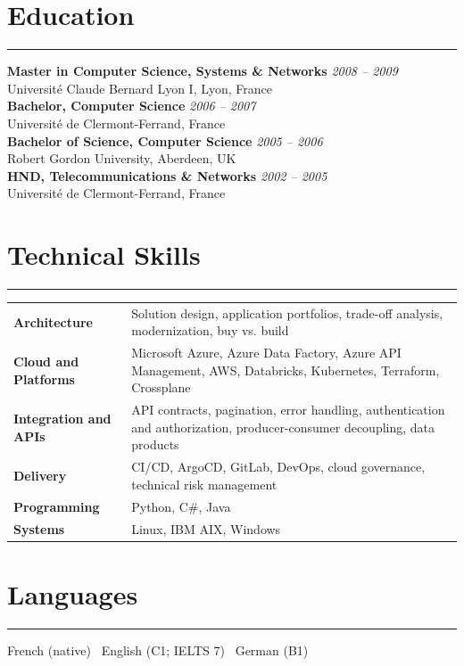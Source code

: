 \documentclass[10pt,a4paper]{article}
\newcommand{\sectionrule}{\noindent\rule{\linewidth}{0.4pt}\par\vspace{0.24em}}
\begin{document}
\section*{Education}
\sectionrule
\textbf{Master in Computer Science, Systems \& Networks} \hfill \textit{2008 -- 2009}\\
Université Claude Bernard Lyon I, Lyon, France\\
\textbf{Bachelor, Computer Science} \hfill \textit{2006 -- 2007}\\
Université de Clermont-Ferrand, France\\
\textbf{Bachelor of Science, Computer Science} \hfill \textit{2005 -- 2006}\\
Robert Gordon University, Aberdeen, UK\\
\textbf{HND, Telecommunications \& Networks} \hfill \textit{2002 -- 2005}\\
Université de Clermont-Ferrand, France

\section*{Technical Skills}
\sectionrule
\begin{tabularx}{\textwidth}{@{}>{\bfseries}l X@{}}
Architecture & Solution design, application portfolios, trade-off analysis, modernization, buy vs. build \\
Cloud and Platforms & Microsoft Azure, Azure Data Factory, Azure API Management, AWS, Databricks, Kubernetes, Terraform, Crossplane \\
Integration and APIs & API contracts, pagination, error handling, authentication and authorization, producer-consumer decoupling, data products \\
Delivery & CI/CD, ArgoCD, GitLab, DevOps, cloud governance, technical risk management \\
Programming & Python, C\#, Java \\
Systems & Linux, IBM AIX, Windows \\
\end{tabularx}

\section*{Languages}
\sectionrule
French (native) \textbullet\ English (C1; IELTS 7) \textbullet\ German (B1)
\end{document}
